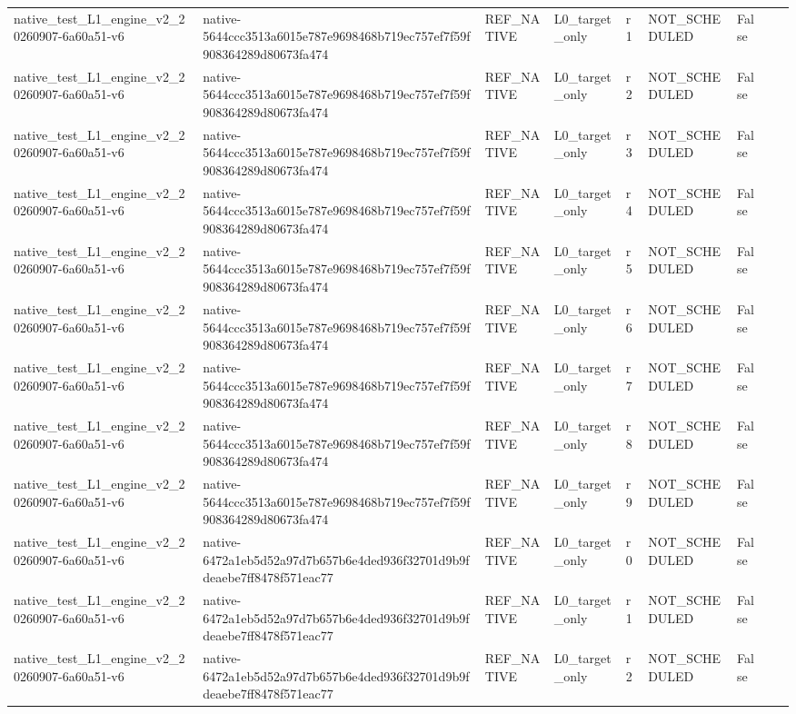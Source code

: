 \begin{tabular}{lllllllll}
native\_test\_L1\_engine\_v2\_20260907-6a60a51-v6 & native-5644ccc3513a6015e787e9698468b719ec757ef7f59f908364289d80673fa474 & REF\_NATIVE & L0\_target\_only & r1 & NOT\_SCHEDULED & False &  &  \\
native\_test\_L1\_engine\_v2\_20260907-6a60a51-v6 & native-5644ccc3513a6015e787e9698468b719ec757ef7f59f908364289d80673fa474 & REF\_NATIVE & L0\_target\_only & r2 & NOT\_SCHEDULED & False &  &  \\
native\_test\_L1\_engine\_v2\_20260907-6a60a51-v6 & native-5644ccc3513a6015e787e9698468b719ec757ef7f59f908364289d80673fa474 & REF\_NATIVE & L0\_target\_only & r3 & NOT\_SCHEDULED & False &  &  \\
native\_test\_L1\_engine\_v2\_20260907-6a60a51-v6 & native-5644ccc3513a6015e787e9698468b719ec757ef7f59f908364289d80673fa474 & REF\_NATIVE & L0\_target\_only & r4 & NOT\_SCHEDULED & False &  &  \\
native\_test\_L1\_engine\_v2\_20260907-6a60a51-v6 & native-5644ccc3513a6015e787e9698468b719ec757ef7f59f908364289d80673fa474 & REF\_NATIVE & L0\_target\_only & r5 & NOT\_SCHEDULED & False &  &  \\
native\_test\_L1\_engine\_v2\_20260907-6a60a51-v6 & native-5644ccc3513a6015e787e9698468b719ec757ef7f59f908364289d80673fa474 & REF\_NATIVE & L0\_target\_only & r6 & NOT\_SCHEDULED & False &  &  \\
native\_test\_L1\_engine\_v2\_20260907-6a60a51-v6 & native-5644ccc3513a6015e787e9698468b719ec757ef7f59f908364289d80673fa474 & REF\_NATIVE & L0\_target\_only & r7 & NOT\_SCHEDULED & False &  &  \\
native\_test\_L1\_engine\_v2\_20260907-6a60a51-v6 & native-5644ccc3513a6015e787e9698468b719ec757ef7f59f908364289d80673fa474 & REF\_NATIVE & L0\_target\_only & r8 & NOT\_SCHEDULED & False &  &  \\
native\_test\_L1\_engine\_v2\_20260907-6a60a51-v6 & native-5644ccc3513a6015e787e9698468b719ec757ef7f59f908364289d80673fa474 & REF\_NATIVE & L0\_target\_only & r9 & NOT\_SCHEDULED & False &  &  \\
native\_test\_L1\_engine\_v2\_20260907-6a60a51-v6 & native-6472a1eb5d52a97d7b657b6e4ded936f32701d9b9fdeaebe7ff8478f571eac77 & REF\_NATIVE & L0\_target\_only & r0 & NOT\_SCHEDULED & False &  &  \\
native\_test\_L1\_engine\_v2\_20260907-6a60a51-v6 & native-6472a1eb5d52a97d7b657b6e4ded936f32701d9b9fdeaebe7ff8478f571eac77 & REF\_NATIVE & L0\_target\_only & r1 & NOT\_SCHEDULED & False &  &  \\
native\_test\_L1\_engine\_v2\_20260907-6a60a51-v6 & native-6472a1eb5d52a97d7b657b6e4ded936f32701d9b9fdeaebe7ff8478f571eac77 & REF\_NATIVE & L0\_target\_only & r2 & NOT\_SCHEDULED & False &  &  \\

\end{tabular}
